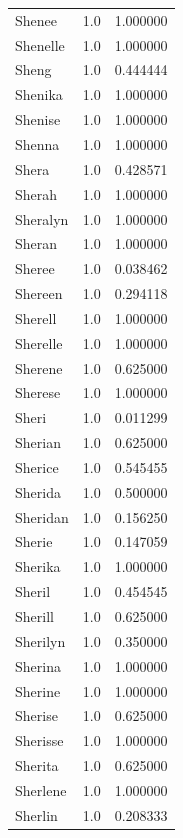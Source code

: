 \documentclass[
  letterpaper,
  DIV=11,
  numbers=noendperiod]{scrreprt}
\begin{document}
\begin{tabular}{lrr}
Shenee          &   1.0 &   1.000000 \\
Shenelle        &   1.0 &   1.000000 \\
Sheng           &   1.0 &   0.444444 \\
Shenika         &   1.0 &   1.000000 \\
Shenise         &   1.0 &   1.000000 \\
Shenna          &   1.0 &   1.000000 \\
Shera           &   1.0 &   0.428571 \\
Sherah          &   1.0 &   1.000000 \\
Sheralyn        &   1.0 &   1.000000 \\
Sheran          &   1.0 &   1.000000 \\
Sheree          &   1.0 &   0.038462 \\
Shereen         &   1.0 &   0.294118 \\
Sherell         &   1.0 &   1.000000 \\
Sherelle        &   1.0 &   1.000000 \\
Sherene         &   1.0 &   0.625000 \\
Sherese         &   1.0 &   1.000000 \\
Sheri           &   1.0 &   0.011299 \\
Sherian         &   1.0 &   0.625000 \\
Sherice         &   1.0 &   0.545455 \\
Sherida         &   1.0 &   0.500000 \\
Sheridan        &   1.0 &   0.156250 \\
Sherie          &   1.0 &   0.147059 \\
Sherika         &   1.0 &   1.000000 \\
Sheril          &   1.0 &   0.454545 \\
Sherill         &   1.0 &   0.625000 \\
Sherilyn        &   1.0 &   0.350000 \\
Sherina         &   1.0 &   1.000000 \\
Sherine         &   1.0 &   1.000000 \\
Sherise         &   1.0 &   0.625000 \\
Sherisse        &   1.0 &   1.000000 \\
Sherita         &   1.0 &   0.625000 \\
Sherlene        &   1.0 &   1.000000 \\
Sherlin         &   1.0 &   0.208333 \\

\end{tabular}
\end{document}
